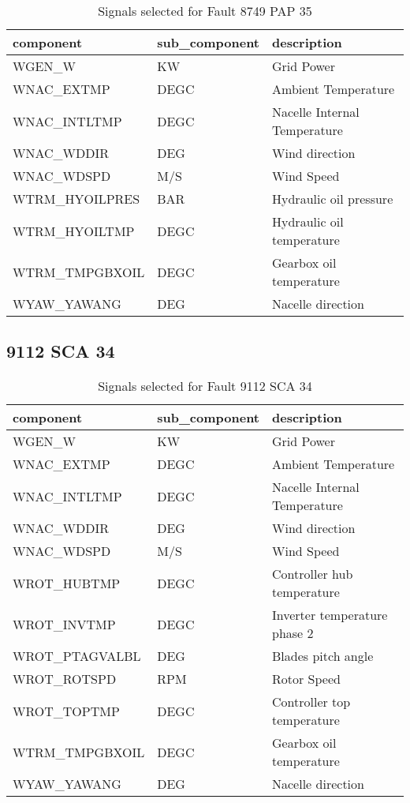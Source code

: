 \begin{table}[!ht]
    \centering
    \begin{tabular}{|l|l|l|}
    \hline
        component & sub\_component & description \\ \hline
        WGEN\_W & KW & Grid Power \\ \hline
        WNAC\_EXTMP & DEGC & Ambient Temperature \\ \hline
        WNAC\_INTLTMP & DEGC & Nacelle Internal Temperature \\ \hline
        WNAC\_WDDIR & DEG & Wind direction \\ \hline
        WNAC\_WDSPD & M/S & Wind Speed \\ \hline
        WTRM\_HYOILPRES & BAR & Hydraulic oil pressure \\ \hline
        WTRM\_HYOILTMP & DEGC & Hydraulic oil temperature \\ \hline
        WTRM\_TMPGBXOIL & DEGC & Gearbox oil temperature \\ \hline
        WYAW\_YAWANG & DEG & Nacelle direction \\ \hline
    \end{tabular}
    \caption{Signals selected for Fault 8749 PAP 35}
\end{table}

\subsection{9112 SCA 34}

\begin{table}[!ht]
    \centering
    \begin{tabular}{|l|l|l|}
    \hline
        component & sub\_component & description \\ \hline
        WGEN\_W & KW & Grid Power \\ \hline
        WNAC\_EXTMP & DEGC & Ambient Temperature \\ \hline
        WNAC\_INTLTMP & DEGC & Nacelle Internal Temperature \\ \hline
        WNAC\_WDDIR & DEG & Wind direction \\ \hline
        WNAC\_WDSPD & M/S & Wind Speed \\ \hline
        WROT\_HUBTMP & DEGC & Controller hub temperature \\ \hline
        WROT\_INVTMP & DEGC & Inverter temperature phase 2 \\ \hline
        WROT\_PTAGVALBL & DEG & Blades pitch angle \\ \hline
        WROT\_ROTSPD & RPM & Rotor Speed \\ \hline
        WROT\_TOPTMP & DEGC & Controller top temperature \\ \hline
        WTRM\_TMPGBXOIL & DEGC & Gearbox oil temperature \\ \hline
        WYAW\_YAWANG & DEG & Nacelle direction \\ \hline
    \end{tabular}
    \caption{Signals selected for Fault 9112 SCA 34}
\end{table}

